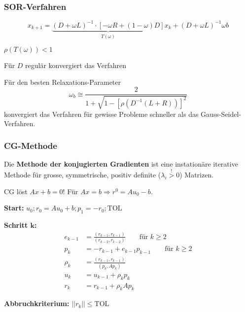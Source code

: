 		\subsubsection{SOR-Verfahren}
			\[
				x_{k+1} = \underbrace{(D+\omega L)^{-1}\cdot[-\omega R + (1-\omega)D]}_{T(\omega)} x_k + (D+\omega L)^{-1}\omega b
			\]
			
			\begin{bedingung}
				$\rho(T(\omega)) < 1$
			\end{bedingung}
			
			\begin{bemerkungen}
				\item Für $D$ regulär konvergiert das Verfahren
				\item Für den besten Relaxations-Parameter \[
					\omega_b \cong \frac{2}{1 + \sqrt{1 - [\rho(D^{-1}(L+R))]^2}}
				\] konvergiert das Verfahren für gewisse Probleme schneller als das Gauss-Seidel-Verfahren.
			\end{bemerkungen}
			
		\subsubsection{CG-Methode}
			\label{cgrad}
			Die \textbf{Methode der konjugierten Gradienten} ist eine instationäre iterative Methode für grosse, symmetrische, positiv definite ($\lambda_i \overset{!}{>} 0$) Matrizen.
			
			\begin{achtung}
				CG löst $Ax + b = 0$! Für $Ax=b \Rightarrow r^0 = Au_0 - b$.
			\end{achtung}

			\begin{tightenumerate}
				\item \textbf{Start:} $u_0 ; r_0 = Au_0 + b ; p_1 = -r_0; \mathrm{TOL}$ 
				\item \textbf{Schritt $\boldsymbol k$:}
					\begin{align*}
						 e_{k-1} &= \frac{(r_{k-1}, r_{k-1})}{(r_{k-2},r_{k-2})} \qquad \text{für } k \geq 2 \\
						 p_k &= -r_{k-1} + e_{k-1}p_{k-1} \qquad \text{für } k \geq 2 \\
						 \rho_k &= \frac{(r_{k-1},r_{k-1})}{(p_k , Ap_k)} \\
						 u_k &= u_{k-1}+\rho_k p_k \\
						 r_k &= r_{k-1} + \rho_k A p_k
					\end{align*}
				\item \textbf{Abbruchkriterium:} $||r_k|| \leq \mathrm{TOL}$ 
			\end{tightenumerate}
			
